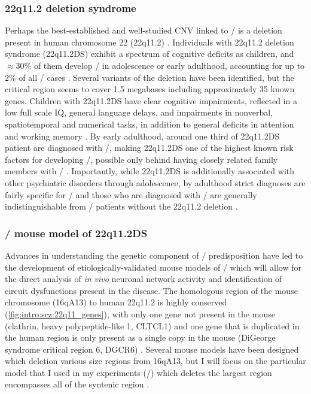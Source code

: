 \subsubsection{22q11.2 deletion syndrome}
\label{sec:intro:scz:22q11}
Perhaps the best-established and well-studied CNV linked to \scz/ is a deletion present in human chromosome 22 (22q11.2) \citep{Karayiorgou1995, Chow2006, Karayiorgou2010}.
Individuals with 22q11.2 deletion syndrome (22q11.2DS) exhibit a spectrum of cognitive deficits as children, and $\approx$30\% of them develop \scz/ in adolescence or early adulthood, accounting for up to 2\% of all \scz/ cases \citep{Stark2008}.
Several variants of the deletion have been identified, but the critical region seems to cover 1.5 megabases including approximately 35 known genes.
Children with 22q11.2DS have clear cognitive impairments, reflected in a low full scale IQ, general language delays, and impairments in nonverbal, spatiotemporal and numerical tasks, in addition to general deficits in attention and working memory \citep{Karayiorgou2010}.
By early adulthood, around one third of 22q11.2DS patient are diagnosed with \scz/, making 22q11.2DS one of the highest known risk factors for developing \scz/, possible only behind having closely related family members with \scz/ \citep{Murphy1999}.
Importantly, while 22q11.2DS is additionally associated with other psychiatric disorders through adolescence, by adulthood strict diagnoses are fairly specific for \scz/ and those who are diagnosed with \scz/ are generally indistinguishable from \scz/ patients without the 22q11.2 deletion \citep{Karayiorgou2010}.

\subsubsection{\df/ mouse model of 22q11.2DS}
Advances in understanding the genetic component of \scz/ predisposition have led to the development of etiologically-validated mouse models of \scz/ which will allow for the direct analysis of \emph{in vivo} neuronal network activity and identification of circuit dysfunctions present in the disease.
The homologous region of the mouse chromosome (16qA13) to human 22q11.2 is highly conserved (\autoref{fig:intro:scz:22q11_genes}), with only one gene not present in the mouse (clathrin, heavy polypeptide-like 1, CLTCL1) and one gene that is duplicated in the human region is only present as a single copy in the mouse (DiGeorge syndrome critical region 6, DGCR6) \citep{Karayiorgou2010}.
Several mouse models have been designed which deletion various size regions from 16qA13, but I will focus on the particular model that I used in my experiments (\df/) which deletes the largest region encompasses all of the syntenic region \citep{Stark2008}.

